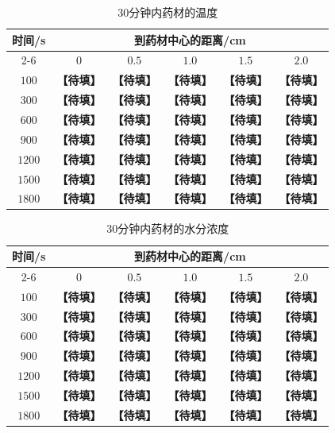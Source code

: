 \documentclass[12pt,a4paper]{article}
\begin{document}
\begin{table}[H]
\centering
\caption{30分钟内药材的温度}
\label{tab:q1-temperature}
\begin{tabular}{cccccc}
\toprule
\multirow{2}{*}{时间/s}
& \multicolumn{5}{c}{到药材中心的距离/cm}\\
\cmidrule(lr){2-6}
& $0$ & $0.5$ & $1.0$ & $1.5$ & $2.0$\\
\midrule
$100$  & \textbf{【待填】} & \textbf{【待填】} & \textbf{【待填】}
       & \textbf{【待填】} & \textbf{【待填】}\\
$300$  & \textbf{【待填】} & \textbf{【待填】} & \textbf{【待填】}
       & \textbf{【待填】} & \textbf{【待填】}\\
$600$  & \textbf{【待填】} & \textbf{【待填】} & \textbf{【待填】}
       & \textbf{【待填】} & \textbf{【待填】}\\
$900$  & \textbf{【待填】} & \textbf{【待填】} & \textbf{【待填】}
       & \textbf{【待填】} & \textbf{【待填】}\\
$1200$ & \textbf{【待填】} & \textbf{【待填】} & \textbf{【待填】}
       & \textbf{【待填】} & \textbf{【待填】}\\
$1500$ & \textbf{【待填】} & \textbf{【待填】} & \textbf{【待填】}
       & \textbf{【待填】} & \textbf{【待填】}\\
$1800$ & \textbf{【待填】} & \textbf{【待填】} & \textbf{【待填】}
       & \textbf{【待填】} & \textbf{【待填】}\\
\bottomrule
\end{tabular}
\end{table}

\begin{table}[H]
\centering
\caption{30分钟内药材的水分浓度}
\label{tab:q1-moisture}
\begin{tabular}{cccccc}
\toprule
\multirow{2}{*}{时间/s}
& \multicolumn{5}{c}{到药材中心的距离/cm}\\
\cmidrule(lr){2-6}
& $0$ & $0.5$ & $1.0$ & $1.5$ & $2.0$\\
\midrule
$100$  & \textbf{【待填】} & \textbf{【待填】} & \textbf{【待填】}
       & \textbf{【待填】} & \textbf{【待填】}\\
$300$  & \textbf{【待填】} & \textbf{【待填】} & \textbf{【待填】}
       & \textbf{【待填】} & \textbf{【待填】}\\
$600$  & \textbf{【待填】} & \textbf{【待填】} & \textbf{【待填】}
       & \textbf{【待填】} & \textbf{【待填】}\\
$900$  & \textbf{【待填】} & \textbf{【待填】} & \textbf{【待填】}
       & \textbf{【待填】} & \textbf{【待填】}\\
$1200$ & \textbf{【待填】} & \textbf{【待填】} & \textbf{【待填】}
       & \textbf{【待填】} & \textbf{【待填】}\\
$1500$ & \textbf{【待填】} & \textbf{【待填】} & \textbf{【待填】}
       & \textbf{【待填】} & \textbf{【待填】}\\
$1800$ & \textbf{【待填】} & \textbf{【待填】} & \textbf{【待填】}
       & \textbf{【待填】} & \textbf{【待填】}\\
\bottomrule
\end{tabular}
\end{table}
\end{document}
